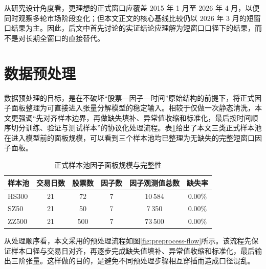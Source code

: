 从研究设计角度看，更理想的正式窗口应覆盖 2015 年 1 月至 2026 年 4 月，以便同时观察多轮市场阶段变化；但本文正文的核心基线比较仍以 2026 年 3 月的短窗口结果为主。因此，后文中首先讨论的实证结论应理解为短窗口口径下的结果，而不是对长期全窗口的直接替代。

\section{数据预处理}

数据预处理的目标，是在不破坏“股票—因子—时间”原始结构的前提下，将正式因子面板整理为可直接进入张量分解模型的稳定输入。相较于仅做一次静态清洗，本文更强调“先对齐样本边界，再做缺失填补、异常值收缩和标准化，最后按时间顺序切分训练、验证与测试样本”的协议化处理流程。表\ref{tab:preprocess-panel-summary}给出了本文三类正式样本池在进入模型前的面板规模，可以看到三个样本池均已整理为无缺失的完整短窗口因子面板。

\begin{table}[htbp]
\centering
\caption{正式样本池因子面板规模与完整性}
\label{tab:preprocess-panel-summary}
\small
\begin{tabular}{lccccc}
\toprule
样本池 & 交易日数 & 股票数 & 因子数 & 因子观测值总数 & 缺失率 \\
\midrule
HS300 & 21 & 72 & 7 & 10\,584 & 0.00\% \\
SZ50  & 21 & 50 & 7 & 7\,350  & 0.00\% \\
ZZ500 & 21 & 500 & 7 & 73\,500 & 0.00\% \\
\bottomrule
\end{tabular}
\end{table}

从处理顺序看，本文采用的预处理流程如图\ref{fig:preprocess-flow}所示。该流程先保证样本口径与交易日对齐，再逐步完成缺失值填补、异常值收缩和标准化，最后输出三阶张量。这样做的目的，是避免不同预处理步骤相互穿插而造成口径混乱。

